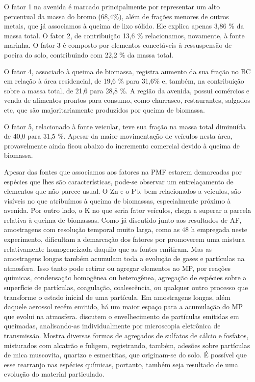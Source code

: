 O fator 1 na avenida é marcado principalmente por representar um alto percentual 
da massa do bromo (68,4\%), além de frações menores de outros metais,
 que já associamos à queima de lixo sólido. Ele explica apenas 3,86 \% da 
massa total. O fator 2, de contribuição 13,6 \% relacionamos, novamente, 
à fonte marinha. O fator 3 é composto por elementos conectáveis à ressuspensão 
de poeira do solo, contribuindo com 22,2 \% da massa total. 

O fator 4, associado à queima de biomassa, registra aumento da sua fração no BC
em relação à área residencial, de 19,6 \% para 31,6\% e, também, na contribuição
sobre a massa total, de 21,6 para 28,8 \%. A região da avenida, possui comércios
e venda de alimentos prontos para consumo, como churrasco, restaurantes, 
salgados etc, que são majoritariamente produzidos por queima de biomassa. 

O fator 5, relacionado à fonte veicular, teve sua fração na massa total 
diminuída de 40,0 para 31,5 \%. Apesar da maior movimentação de veículos nesta 
área, provavelmente ainda ficou abaixo do incremento comercial devido à 
queima de biomassa.

Apesar das fontes que associamos aos fatores na PMF estarem demarcadas por 
espécies que lhes são características, pode-se observar um entrelaçamento de 
elementos que não parece usual. O Zn e o Pb, bem relacionados a veículos, 
são visíveis no que atribuímos à queima de biomassas, especialmente próximo à 
avenida. Por outro lado, o K no que seria fator veículos, chega a superar a 
parcela relativa à queima de biomassas.
Como já discutido junto aos resultados de AF, amostragens com resolução 
temporal muito larga, como as 48 h empregada neste experimento, dificultam a 
demarcação dos fatores por promoverem uma mistura relativamente homogeneizada 
daquilo que as fontes emitiram.
Mas as amostragens longas também acumulam toda a evolução de gases e 
partículas na atmosfera. Isso tanto pode retirar ou agregar elementos ao MP, 
por reações químicas, condensação homogênea ou heterogênea, agregação de 
espécies sobre a superfície de partículas, coagulação, coalescência, ou 
qualquer outro processo que transforme o estado inicial de uma partícula. 
Em amostragens longas, além daquele aerossol recém emitido, há um maior espaço 
para a acumulação do MP que evolui na atmosfera. 
\citet{li2003} discutem o envelhecimento de partículas emitidas em queimadas, 
analisando-as individualmente por microscopia eletrônica de transmissão. 
Mostra diversas formas de agregados de sulfatos de cálcio e fosfatos, 
misturados com alcatrão e fuligem, registrando, também, adesões sobre partículas 
de mica muscovita, quartzo e esmectitas, que originam-se do solo. É possível que
esse rearranjo nas espécies químicas, portanto, também seja resultado de uma 
evolução do material particulado.

